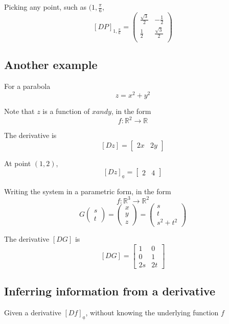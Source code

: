 Picking any point, such as $(1, \frac{ \pi}{6}$, \[
   [DP]_{1, \frac{\pi}{6}} = \begin{pmatrix} 
      \frac{\sqrt{3}}{2} & -\frac{1}{2}   \\
      \frac{1}{2} & \frac{\sqrt{3}}{2}   \\
   \end{pmatrix}
\] 

\subsection{Another example}
For a parabola \[
  z = x^2 + y^2
\] 

Note that $z$ is a function of $x and y$, in the form
 \[
  f: \mathbb{R}^2 \to \mathbb{R}
\]  

The derivative is
\[
   [Dz] = \begin{bmatrix} 
      2x & 2y
   \end{bmatrix}
\] 

At point $(1, 2)$, \[
   [Dz]_{ \underline{a} } = \begin{bmatrix} 
      2 & 4  
   \end{bmatrix}
\] 

Writing the system in a parametric form, in the form \[
  f: \mathbb{R}^3 \to \mathbb{R}^2
\] 
\[
  G \begin{pmatrix} s \\ t \end{pmatrix} = \begin{pmatrix} x \\ y \\ z \end{pmatrix}  = \begin{pmatrix} 
    s \\ t \\ s^2 + t^2  
  \end{pmatrix}
\] 

The derivative $[DG]$ is
 \[
    [DG] = \begin{bmatrix} 
       1 & 0 \\  
       0 & 1 \\  
       2s & 2t
    \end{bmatrix}
\] 

\subsection{Inferring information from a derivative}
Given a derivative $[Df]_{ \underline{a}}$, without knowing the underlying function $f$ 

